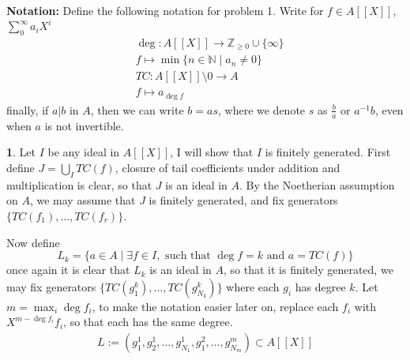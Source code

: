 \documentclass[11pt]{article}
\theoremstyle{definition}
\newtheorem{pb}{}
\newcommand{\set}[1]{\{#1\}}
\newcommand{\tand}{\text{ and }}
\begin{document}
    \textbf{Notation:} Define the following notation for problem 1. Write for \(f \in A[[X]]\), \(\sum_0^\infty a_iX^i\)
    \begin{align*}
        &\deg: A[[X]] \to \mathbb{Z}_{\geq 0}\cup\set{\infty} \\
        &f \mapsto \min\set{n \in \mathbb{N} \mid a_n \neq 0} \\
        &TC: A[[X]] \setminus 0 \to A \\
        &f \mapsto a_{\deg f}
    \end{align*}
    finally, if \(a \vert b\) in \(A\), then we can write \(b = as\), where we denote \(s\) as \(\frac{b}{a}\) or \(a^{-1}b\), even when \(a\) is not invertible.

    \begin{pb}
        Let \(I\) be any ideal in \(A[[X]]\), I will show that \(I\) is finitely generated. First define \(J = \bigcup_I TC(f)\), closure of tail coefficients under addition and multiplication is clear, so that \(J\) is an ideal in \(A\). By the Noetherian assumption on \(A\), we may assume that \(J\) is finitely generated, and fix generators \(\set{TC(f_1),\hdots,TC(f_r)}\).
        
        Now define \[L_k = \set{a \in A \mid \exists f \in I, \text{ such that } \deg f = k \tand a = TC(f)}\]
        once again it is clear that \(L_k\) is an ideal in \(A\), so that it is finitely generated, we may fix generators \(\set{TC(g^k_1),\hdots,TC(g^k_{N_k})}\) where each \(g_i\) has degree \(k\). Let \(m = \max_i\deg f_i\), to make the notation easier later on, replace each \(f_i\) with \(X^{m - \deg f_i}f_i\), so that each has the same degree.
        \begin{align*}
            L := (g_1^1,g_2^1,\hdots,g_{N_1}^1,g_1^2,\hdots,g_{N_m}^m) \subset A[[X]]
        \end{align*}


\end{pb}
\end{document}
